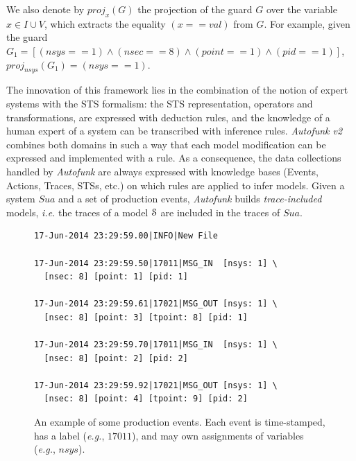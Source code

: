 We also denote by $proj_{x}(G)$ the projection of the guard $G$
over the variable $x \in I \cup V$, which extracts the equality
$(x==val)$ from $G$. For example, given the guard $G_1 =
[(nsys==1) \wedge (nsec==8) \wedge (point==1) \wedge (pid==1)]$,
$proj_{nsys}(G_1) = (nsys==1)$.

The innovation of this framework lies in the combination of the
notion of expert systems with the STS formalism: the STS
representation, operators and transformations, are expressed
with deduction rules, and the knowledge of a human expert of a
system can be transcribed with inference rules.
\textit{Autofunk v2} combines both domains in such a way that
each model modification can be expressed and implemented with a
rule.  As a consequence, the data collections handled by
\textit{Autofunk} are always expressed with knowledge bases
(Events, Actions, Traces, STSs, etc.) on which rules are applied
to infer models. Given a system $\mathit{Sua}$ and a set of
production events, \textit{Autofunk} builds \emph{trace-included}
models, \emph{i.e.} the traces of a model $\EuScript{S}$ are
included in the traces of $\mathit{Sua}$.

\begin{figure}[ht]
\begin{framed}
\begin{BVerbatim}
17-Jun-2014 23:29:59.00|INFO|New File

17-Jun-2014 23:29:59.50|17011|MSG_IN  [nsys: 1] \
  [nsec: 8] [point: 1] [pid: 1]

17-Jun-2014 23:29:59.61|17021|MSG_OUT [nsys: 1] \
  [nsec: 8] [point: 3] [tpoint: 8] [pid: 1]

17-Jun-2014 23:29:59.70|17011|MSG_IN  [nsys: 1] \
  [nsec: 8] [point: 2] [pid: 2]

17-Jun-2014 23:29:59.92|17021|MSG_OUT [nsys: 1] \
  [nsec: 8] [point: 4] [tpoint: 9] [pid: 2]
\end{BVerbatim}
\end{framed}

\caption{An example of some production events. Each event is
time-stamped, has a label (\emph{e.g.}, $17011$), and may own
assignments of variables (\emph{e.g.}, $nsys$).}
\label{fig:rawdatum}
\end{figure}

